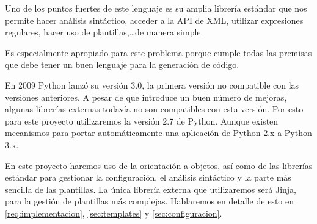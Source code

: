 Uno de los puntos fuertes de este lenguaje es su amplia librería estándar que nos permite hacer análisis sintáctico, acceder a la API de XML, utilizar expresiones regulares, hacer uso de plantillas,\ldots de manera simple.\par
Es especialmente apropiado para este problema porque cumple todas las premisas que debe tener un buen lenguaje para la generación de código.\par
En 2009 Python lanzó su versión 3.0, la primera versión no compatible con las versiones anteriores. A pesar de que introduce un buen número de mejoras, algunas librerías externas todavía no son compatibles con esta versión. Por esto para este proyecto utilizaremos la versión 2.7 de Python. Aunque existen mecanismos \cite{py:2to3} para portar automáticamente una aplicación de Python 2.x a Python 3.x.\par
En este proyecto haremos uso de la orientación a objetos, así como de las librerías estándar para gestionar la configuración, el análisis sintáctico y la parte más sencilla de las plantillas. La única librería externa que utilizaremos será Jinja, para la gestión de plantillas más complejas. Hablaremos en detalle de esto en \ref{req:implementacion}, \ref{sec:templates} y \ref{sec:configuracion}.

